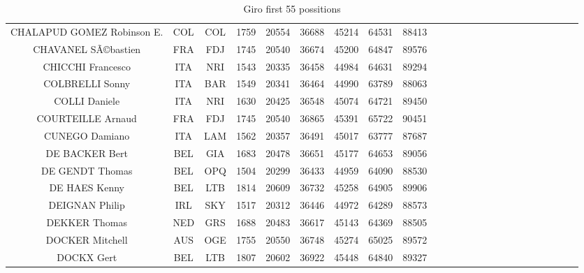 \documentclass[10pt]{article}
\begin{document}
\begin{table}
\begin{tabular}{c c c c c c c c c c c c c c c c c c c c c c c c}
 CHALAPUD GOMEZ Robinson E. & COL &  COL &  1759 &  20554 &  36688 &  45214 &  64531 &  88413 \\
 CHAVANEL SÃ©bastien & FRA &  FDJ &  1745 &  20540 &  36674 &  45200 &  64847 &  89576 \\
 CHICCHI Francesco & ITA &  NRI &  1543 &  20335 &  36458 &  44984 &  64631 &  89294 \\
 COLBRELLI Sonny & ITA &  BAR &  1549 &  20341 &  36464 &  44990 &  63789 &  88063 \\
 COLLI Daniele & ITA &  NRI &  1630 &  20425 &  36548 &  45074 &  64721 &  89450 \\
 COURTEILLE Arnaud & FRA &  FDJ &  1745 &  20540 &  36865 &  45391 &  65722 &  90451 \\
 CUNEGO Damiano & ITA &  LAM &  1562 &  20357 &  36491 &  45017 &  63777 &  87687 \\
 DE BACKER Bert & BEL &  GIA &  1683 &  20478 &  36651 &  45177 &  64653 &  89056 \\
 DE GENDT Thomas & BEL &  OPQ &  1504 &  20299 &  36433 &  44959 &  64090 &  88530 \\
 DE HAES Kenny & BEL &  LTB &  1814 &  20609 &  36732 &  45258 &  64905 &  89906 \\
 DEIGNAN Philip & IRL &  SKY &  1517 &  20312 &  36446 &  44972 &  64289 &  88573 \\
 DEKKER Thomas & NED &  GRS &  1688 &  20483 &  36617 &  45143 &  64369 &  88505 \\
 DOCKER Mitchell & AUS &  OGE &  1755 &  20550 &  36748 &  45274 &  65025 &  89572 \\
 DOCKX Gert & BEL &  LTB &  1807 &  20602 &  36922 &  45448 &  64840 &  89327 \\
\hline
\end{tabular}
\caption{Giro first 55 possitions}
\label{tab:myfirsttable}
\end{table}
\end{document}
